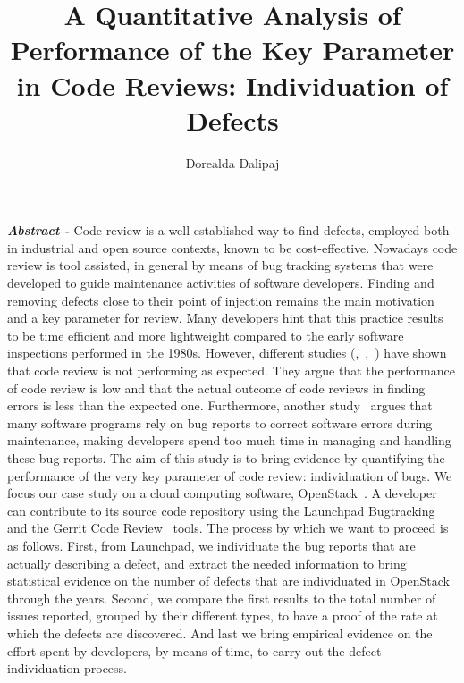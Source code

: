 \documentclass[ifip]{svmult}
\begin{document}
\title*{A Quantitative Analysis of Performance of the Key Parameter in Code Reviews:  Individuation of Defects}
\author{Dorealda Dalipaj}
%
%
\maketitle

\textbf{\textit{Abstract -}} Code review is a well-established way to find defects, employed both in industrial and open source contexts, known to be cost-effective. 
Nowadays code review is tool assisted, in general by means of bug tracking systems that were developed to guide maintenance activities of 
software developers. Finding and removing defects close to their point of injection remains the main motivation and a key parameter
for review. Many developers hint that this practice results to be time efficient and more lightweight compared to the early software inspections 
performed in the 1980s. 
However, different studies (\cite{contribution1},~\cite{contribution9},~\cite{contribution20}) have shown that code review is not performing as expected. 
They argue that the performance of code review 
is low and that the actual outcome of code reviews in finding errors is less than the expected one. Furthermore, another study~\cite{contribution10} argues that many software programs 
rely on bug reports to correct software errors during maintenance, making developers spend too much time in managing and handling these bug reports. 
The aim of this study is to bring evidence by quantifying the performance of the very key parameter of code review: individuation of bugs.
We focus our case study on a cloud computing software, OpenStack~\cite{contribution11}. 
A developer can contribute to its source code repository using the Launchpad Bugtracking~\cite{contribution12} and the Gerrit Code Review~\cite{contribution13} tools.
The process by which we want to proceed is as follows. First, from Launchpad, we individuate the bug reports that are actually describing a defect, 
and extract the needed information to bring statistical evidence on the number of defects that are individuated in OpenStack through the 
years. Second, we compare the first results to the total number of issues reported, grouped by their different types, 
to have a proof of the rate at which the defects are discovered. And last we bring empirical evidence on the effort spent by developers, 
by means of time, to carry out the defect individuation process.
\end{document}
